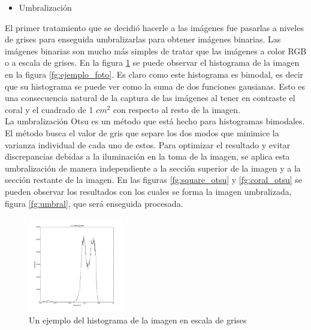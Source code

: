 \documentclass[journal]{IEEEtran}
\begin{document}
\begin{itemize}
    \item Umbralización
\end{itemize}
\begin{par}
El primer tratamiento que se decidió hacerle a las imágenes fue pasarlas
a niveles de grises para enseguida umbralizarlas para obtener imágenes
binarias. Las imágenes binarias son mucho más simples de tratar que las
imágenes a color RGB o a escala de grises. En la figura
\ref{fg:ejemplo_histograma} se puede observar el histograma de la imagen
en la figura \ref{fg:ejemplo_foto}. Es claro como este histograma es
bimodal, es decir que su histograma se puede ver como la suma de dos
funciones gausianas. Esto es una consecuencia natural de la captura de
las imágenes al tener en contraste el coral y el cuadrado de 1 $cm^2$ con
respecto al resto de la imagen. \\

La umbralización Otsu es un método que está hecho para histogramas
bimodales. El método busca el valor de gris que separe los dos modos que
minimice la varianza individual de cada uno de estos. Para optimizar el
resultado y evitar discrepancias debidas a la iluminación en la toma de
la imagen, se aplica esta umbralización de manera independiente a la
sección superior de la imagen y a la sección restante de la imagen. En
las figuras \ref{fg:square_otsu} y \ref{fg:coral_otsu} se pueden observar
los resultados con los cuales se forma la imagen umbralizada, figura
\ref{fg:umbral}, que será enseguida procesada.
\end{par}

\begin{figure}[ht]
\begin{center}
\includegraphics[width=0.37\textwidth]{resultados/Coral_3_S3_histogram} %
\caption{Un ejemplo del histograma de la imagen en escala de grises}
\label{fg:ejemplo_histograma}
\end{center}
\end{figure}
\FloatBarrier
\end{document}
